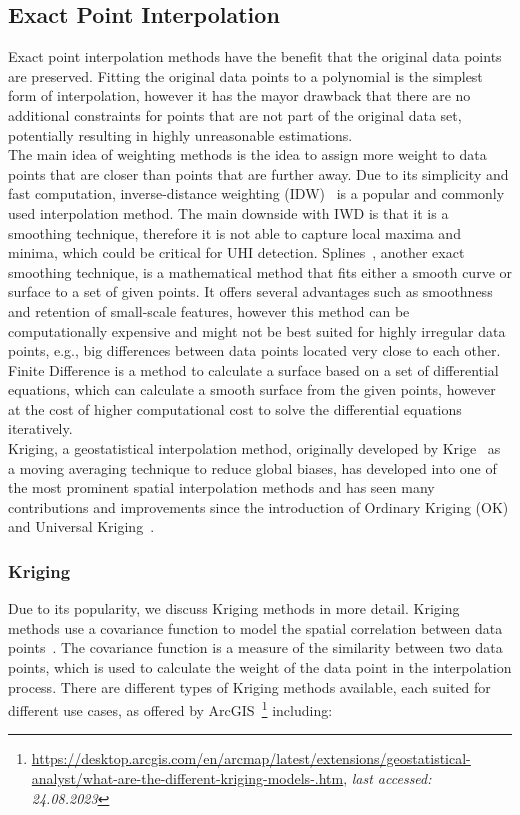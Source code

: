 \subsection{Exact Point Interpolation}

Exact point interpolation methods have the benefit that the original data points are preserved. Fitting the original data points to a polynomial is the simplest form of interpolation, however it has the mayor drawback that there are no additional constraints for points that are not part of the original data set, potentially resulting in highly unreasonable estimations.\\
The main idea of weighting methods is the idea to assign more weight to data points that are closer than points that are further away. Due to its simplicity and fast computation, inverse-distance weighting (IDW)~\cite{willmott1985small} is a popular and commonly used interpolation method. The main downside with IWD is that it is a smoothing technique, therefore it is not able to capture local maxima and minima, which could be critical for UHI detection. Splines~\cite{mitavs1988general}, another exact smoothing technique, is a mathematical method that fits either a smooth curve or surface to a set of given points. It offers several advantages such as smoothness and retention of small-scale features, however this method can be computationally expensive and might not be best suited for highly irregular data points, e.g., big differences between data points located very close to each other. Finite Difference is a method to calculate a surface based on a set of differential equations, which can calculate a smooth surface from the given points, however at the cost of higher computational cost to solve the differential equations iteratively.\\
Kriging, a geostatistical interpolation method, originally developed by Krige~\cite{krige1976review} as a moving averaging technique to reduce global biases, has developed into one of the most prominent spatial interpolation methods and has seen many contributions and improvements since the introduction of Ordinary Kriging (OK) and Universal Kriging~\cite{li2014spatial}.

\subsubsection{Kriging}

Due to its popularity, we discuss Kriging methods in more detail. Kriging methods use a covariance function to model the spatial correlation between data points~\cite{wackernagel2003multivariate}. The covariance function is a measure of the similarity between two data points, which is used to calculate the weight of the data point in the interpolation process. There are different types of Kriging methods available, each suited for different use cases, as offered by ArcGIS~\footnote{\url{https://desktop.arcgis.com/en/arcmap/latest/extensions/geostatistical-analyst/what-are-the-different-kriging-models-.htm}, \textit{last accessed: 24.08.2023}} including:

